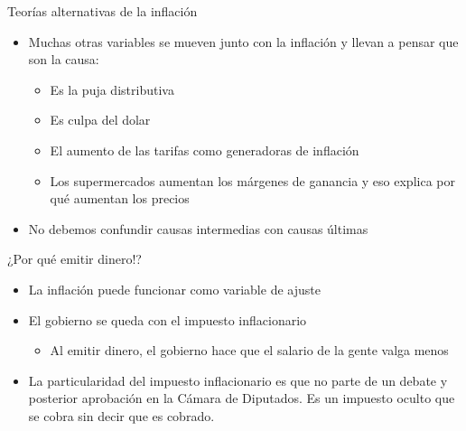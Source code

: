 \documentclass{beamer}
\begin{document}
\begin{frame}{Teorías alternativas de la inflación}
    \begin{itemize}
        \item Muchas otras variables se mueven junto con la inflación y llevan a pensar que son la causa:
        \begin{itemize}
            \item Es la puja distributiva
            \item Es culpa del dolar
            \item El aumento de las tarifas como generadoras de inflación
            \item Los supermercados aumentan los márgenes de ganancia y eso explica por qué aumentan los precios
        \end{itemize}
        \item No debemos confundir causas intermedias con causas últimas
    \end{itemize}
\end{frame}




\begin{frame}{¿Por qué emitir dinero!?}
    \begin{itemize}
        \item La inflación puede funcionar como variable de ajuste
        \item El gobierno se queda con el impuesto inflacionario
        \begin{itemize}
            \item Al emitir dinero, el gobierno hace que el salario de la gente valga menos
        \end{itemize}
        \item La particularidad del impuesto inflacionario es que no parte de un debate y posterior aprobación en la Cámara de Diputados. Es un impuesto oculto que se cobra sin decir que es cobrado.
    \end{itemize}
\end{frame}
\end{document}
